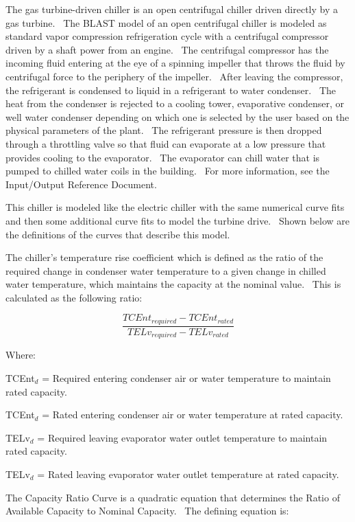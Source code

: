 The gas turbine-driven chiller is an open centrifugal chiller driven directly by a gas turbine.~ The BLAST model of an open centrifugal chiller is modeled as standard vapor compression refrigeration cycle with a centrifugal compressor driven by a shaft power from an engine.~ The centrifugal compressor has the incoming fluid entering at the eye of a spinning impeller that throws the fluid by centrifugal force to the periphery of the impeller.~ After leaving the compressor, the refrigerant is condensed to liquid in a refrigerant to water condenser.~ The heat from the condenser is rejected to a cooling tower, evaporative condenser, or well water condenser depending on which one is selected by the user based on the physical parameters of the plant.~ The refrigerant pressure is then dropped through a throttling valve so that fluid can evaporate at a low pressure that provides cooling to the evaporator.~ The evaporator can chill water that is pumped to chilled water coils in the building.~ For more information, see the Input/Output Reference Document.

This chiller is modeled like the electric chiller with the same numerical curve fits and then some additional curve fits to model the turbine drive.~ Shown below are the definitions of the curves that describe this model.

The chiller's temperature rise coefficient which is defined as the ratio of the required change in condenser water temperature to a given change in chilled water temperature, which maintains the capacity at the nominal value.~ This is calculated as the following ratio:

\begin{equation}
\frac{{TCEn{t_{required}} - TCEn{t_{rated}}}}{{TEL{v_{required}} - TEL{v_{rated}}}}
\end{equation}

Where:

TCEnt\(_{d}\) = Required entering condenser air or water temperature to maintain rated capacity.

TCEnt\(_{d}\) = Rated entering condenser air or water temperature at rated capacity.

TELv\(_{d}\) = Required leaving evaporator water outlet temperature to maintain rated capacity.

TELv\(_{d}\) = Rated leaving evaporator water outlet temperature at rated capacity.

The Capacity Ratio Curve is a quadratic equation that determines the Ratio of Available Capacity to Nominal Capacity.~ The defining equation is:

